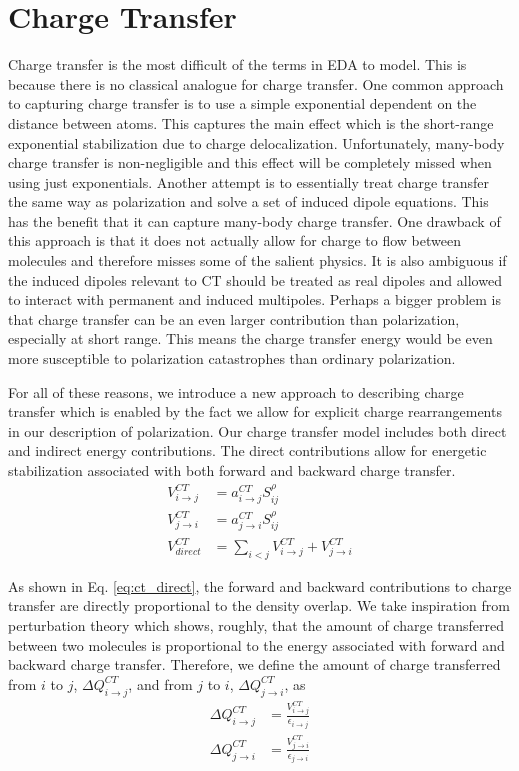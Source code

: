 \documentclass[journal=jacsat,manuscript=article]{achemso}
\begin{document}
\section*{Charge Transfer}
Charge transfer is the most difficult of the terms in EDA to model. This is
because there is no classical analogue for charge transfer. One common approach to
capturing charge transfer is to use a simple exponential dependent on the distance
between atoms.\cite{rackers2021polarizable} This captures the main effect which is the
short-range exponential stabilization due to charge delocalization. Unfortunately,
many-body charge transfer is non-negligible and this effect will be completely
missed when using just exponentials. Another attempt is to essentially treat
charge transfer the same way as polarization and solve a set of induced dipole equations.\cite{das2019development,wang2023general}
This has the benefit that it can capture many-body charge transfer. One drawback of this
approach is that it does not actually allow for charge to flow between molecules
and therefore misses some of the salient physics. It is also ambiguous if the induced
dipoles relevant to CT should be treated as real dipoles and allowed to interact 
with permanent and induced multipoles. Perhaps a bigger problem is that
charge transfer can be an even larger contribution than polarization, especially at short range.
This means the charge transfer energy would be even more susceptible to
polarization catastrophes than ordinary polarization.

For all of these reasons, we introduce a new approach to describing charge transfer
which is enabled by the fact we allow for explicit charge rearrangements in our
description of polarization. Our charge transfer model includes both direct and
indirect energy contributions. The direct contributions allow for energetic stabilization
associated with both forward and backward charge transfer.
\begin{align}
  V^{CT}_{i\rightarrow j}&=a_{i\rightarrow j}^{CT}S_{ij}^\rho\\
  V^{CT}_{j\rightarrow i}&=a_{j\rightarrow i}^{CT}S_{ij}^\rho\\
  V^{CT}_{direct}&=\sum_{i<j}V^{CT}_{i\rightarrow j}+V^{CT}_{j\rightarrow i}
  \label{eq:ct_direct}
\end{align}

As shown in Eq. \ref{eq:ct_direct}, the forward and backward contributions to
charge transfer are directly proportional to the density overlap.
We take inspiration from perturbation theory which shows, roughly, that
the amount of charge transferred between two molecules is proportional to the
energy associated with forward and backward charge transfer.\cite{khaliullin2007unravelling,khaliullin2008analysis,khaliullin2009electron}
Therefore, we define the amount of charge transferred from $i$ to $j$, $\Delta Q^{CT}_{i\rightarrow j}$,
and from $j$ to $i$, $\Delta Q^{CT}_{j\rightarrow i}$, as
\begin{align}
  \Delta Q^{CT}_{i\rightarrow j}&=\frac{V^{CT}_{i\rightarrow j}}{\epsilon_{i\rightarrow j}}\\
  \Delta Q^{CT}_{j\rightarrow i}&=\frac{V^{CT}_{j\rightarrow i}}{\epsilon_{j\rightarrow i}}
\end{align}
\end{document}
